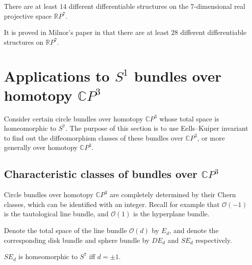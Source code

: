 \documentclass[twoside]{article}
\begin{document}
\begin{prop}
    There are at least $14$ different differentiable structures on the $7$-dimensional real projective space $\mathbb{R}P^7$. 
\end{prop}

It is proved in Milnor's paper in \cite{milnorspin} that there are at least $28$ different differentiable structures on  $\mathbb{R}P^7$. 




\section{Applications to \texorpdfstring{$S^1$}{S1} bundles over homotopy \texorpdfstring{$\mathbb{C}P^3$}{CP3}}

Consider certain circle bundles over homotopy $\mathbb{C}P^3$ whose total space is homeomorphic to $S^7$. The purpose of this section is to use Eells--Kuiper invariant to find out the diffeomorphism classes of these bundles over $\mathbb{C}P^3$, or more generally over homotopy $\mathbb{C}P^3$. 

\subsection{Characteristic classes of bundles over \texorpdfstring{$\mathbb{C}P^3$}{CP3}}

Circle bundles over homotopy $\mathbb{C}P^3$ are completely determined by their Chern classes, which can be identified with an integer. Recall for example that $\mathcal{O}(-1)$ is the tautological line bundle, and $\mathcal{O}(1)$ is the hyperplane bundle. 

Denote the total space of the line bundle $\mathcal{O}(d)$ by $E_d$, and denote the corresponding disk bundle and sphere bundle by $DE_d$ and $SE_d$ respectively. 
\begin{thm}
	$SE_d$ is homeomorphic to $S^7$ iff $d = \pm 1$. 
\end{thm}
\end{document}
